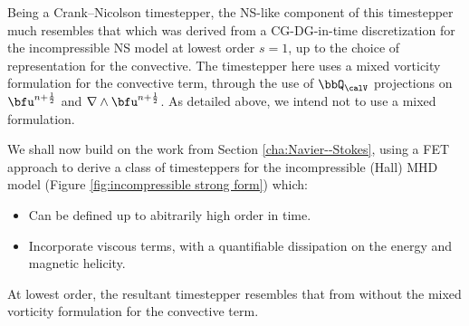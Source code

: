     Being a Crank--Nicolson timestepper, the NS-like component of this timestepper much resembles that which was derived from a CG-DG-in-time discretization for the incompressible NS model at lowest order $s = 1$, up to the choice of representation for the convective. The timestepper here uses a mixed vorticity formulation for the convective term, through the use of $\bbQ_{\calV}$ projections on $\bfu^{n + \frac{1}{2}}$ and $\nabla\wedge\bfu^{n + \frac{1}{2}}$. As detailed above, we intend not to use a mixed formulation.

    \line

    We shall now build on the work from Section \ref{cha:Navier--Stokes}, using a FET approach to derive a class of timesteppers for the incompressible (Hall) MHD model (Figure \ref{fig:incompressible strong form}) which:
    \begin{itemize}
        \item  Can be defined up to abitrarily high order in time.
        \item  Incorporate viscous terms, with a quantifiable dissipation on the energy and magnetic helicity.
    \end{itemize}
    At lowest order, the resultant timestepper resembles that from \cite{Laakmann_Hu_Farrell_2022} without the mixed vorticity formulation for the convective term.

    \shortline

